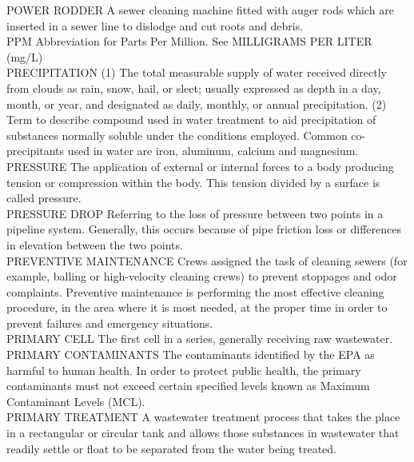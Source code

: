 \documentclass{article}
\begin{document}
POWER RODDER
A sewer cleaning machine fitted with auger rods which are inserted in a sewer line to dislodge and cut roots and debris. 
\vspace{0.3cm}\\
PPM
Abbreviation for Parts Per Million. See MILLIGRAMS PER LITER (mg/L)
\vspace{0.3cm}\\
PRECIPITATION
(1) The total measurable supply of water received directly from clouds as rain, snow, hail, or sleet; usually expressed as depth in a day, month, or year, and designated as daily, monthly, or annual precipitation. (2) Term to describe compound used in water treatment to aid precipitation of substances normally soluble under the conditions employed. Common co-precipitants used in water are iron, aluminum, calcium and magnesium.
\vspace{0.3cm}\\
PRESSURE
The application of external or internal forces to a body producing tension or compression within the body. This tension divided by a surface is called pressure.
\vspace{0.3cm}\\
PRESSURE DROP
Referring to the loss of pressure between two points in a pipeline system. Generally, this occurs because of pipe friction loss or differences in elevation between the two points.
\vspace{0.3cm}\\
PREVENTIVE MAINTENANCE
Crews assigned the task of cleaning sewers (for example, balling or high-velocity cleaning crews) to prevent stoppages and odor complaints. Preventive maintenance is performing the most effective cleaning procedure, in the area where it is most needed, at the proper time in order to prevent failures and emergency situations. 
\vspace{0.3cm}\\
PRIMARY CELL
The first cell in a series, generally receiving raw wastewater.
\vspace{0.3cm}\\
PRIMARY CONTAMINANTS
The contaminants identified by the EPA as harmful to human health. In order to protect public health, the primary contaminants must not exceed certain specified levels known as Maximum Contaminant Levels (MCL). 
\vspace{0.3cm}\\
PRIMARY TREATMENT
A wastewater treatment process that takes the place in a rectangular or circular tank and allows those substances in wastewater that readily settle or float to be separated from the water being treated.
\end{document}
